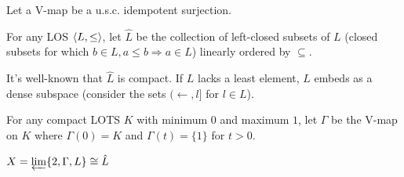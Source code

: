 \documentclass[11pt]{article}
\begin{document}
  \begin{definition}
    Let a V-map be a u.s.c. idempotent surjection.
  \end{definition}

  \begin{definition}
    For any LOS \(\langle L,\leq\rangle\), let \(\hat L\) be the collection of
    left-closed subsets of \(L\)
    (closed subsets for which \(b\in L,a\leq b\Rightarrow a\in L\))
    linearly ordered by \(\subseteq\).
  \end{definition}

  It's well-known that \(\hat L\) is compact. If \(L\) lacks a least element,
  \(L\) embeds as a dense subspace (consider the sets
  \((\leftarrow,l]\) for \(l\in L\)).

  \begin{definition}
    For any compact LOTS \(K\) with minimum \(0\) and maximum \(1\),
    let \(\Gamma\) be the V-map on \(K\) where \(\Gamma(0)=K\) and \(\Gamma(t)=\{1\}\)
    for \(t>0\).
  \end{definition}

  \begin{theorem}
    \(X=\varprojlim \{2, \Gamma, L\}\cong \hat L\)
  \end{theorem}
\end{document}
